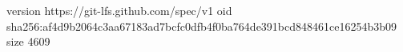 version https://git-lfs.github.com/spec/v1
oid sha256:af4d9b2064c3aa67183ad7bcfc0dfb4f0ba764de391bcd848461ce16254b3b09
size 4609
